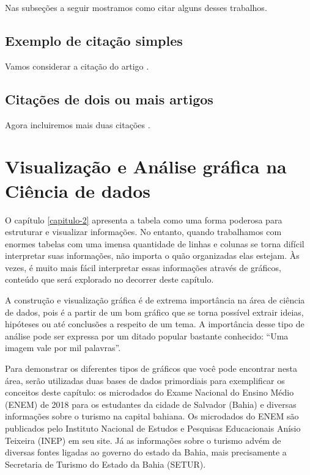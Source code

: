 \documentclass[
]{book}
\begin{document}
Nas subseções a seguir mostramos como citar alguns desses trabalhos.

\hypertarget{exemplo-de-citauxe7uxe3o-simples}{%
\section{Exemplo de citação simples}\label{exemplo-de-citauxe7uxe3o-simples}}

Vamos considerar a citação do artigo \citep{Partanen2016}.

\hypertarget{citauxe7uxf5es-de-dois-ou-mais-artigos}{%
\section{Citações de dois ou mais artigos}\label{citauxe7uxf5es-de-dois-ou-mais-artigos}}

Agora incluiremos mais duas citações \citep[\citet{Williams2020}]{DaSilvaEloy2017}.

\hypertarget{capitulo-3}{%
\chapter{Visualização e Análise gráfica na Ciência de dados}\label{capitulo-3}}

O capítulo \ref{capitulo-2} apresenta a tabela como uma forma poderosa para estruturar e visualizar informações. No entanto, quando trabalhamos com enormes tabelas com uma imensa quantidade de linhas e colunas se torna difícil interpretar suas informações, não importa o quão organizadas elas estejam. Às vezes, é muito mais fácil interpretar essas informações através de gráficos, conteúdo que será explorado no decorrer deste capítulo.

A construção e visualização gráfica é de extrema importância na área de ciência de dados, pois é a partir de um bom gráfico que se torna possível extrair ideias, hipóteses ou até conclusões a respeito de um tema. A importância desse tipo de análise pode ser expressa por um ditado popular bastante conhecido: ``Uma imagem vale por mil palavras''.

Para demonstrar os diferentes tipos de gráficos que você pode encontrar nesta área, serão utilizadas duas bases de dados primordiais para exemplificar os conceitos deste capítulo: os microdados do Exame Nacional do Ensino Médio (ENEM) de 2018 para os estudantes da cidade de Salvador (Bahia) e diversas informações sobre o turismo na capital bahiana. Os microdados do ENEM são publicados pelo Instituto Nacional de Estudos e Pesquisas Educacionais Anísio Teixeira (INEP) em seu site. Já as informações sobre o turismo advém de diversas fontes ligadas ao governo do estado da Bahia, mais precisamente a Secretaria de Turismo do Estado da Bahia (SETUR).
\end{document}
